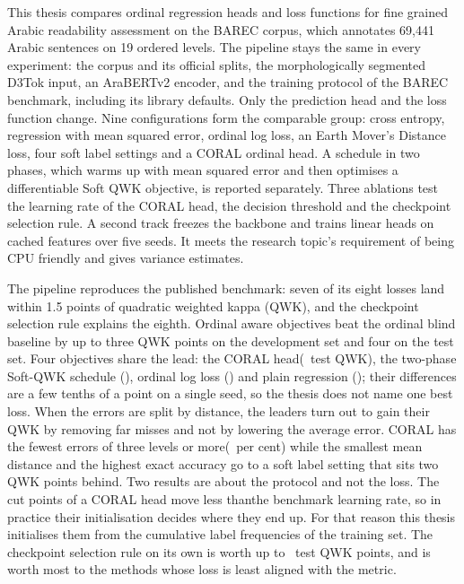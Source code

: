 \documentclass[12pt]{report}
\begin{document}
This thesis compares ordinal regression heads and loss functions for fine grained Arabic readability assessment on the BAREC corpus, which annotates 69,441 Arabic sentences on 19 ordered levels. The pipeline stays the same in every experiment: the corpus and its official splits, the morphologically segmented D3Tok input, an AraBERTv2 encoder, and the training protocol of the BAREC benchmark, including its library defaults. Only the prediction head and the loss function change. Nine configurations form the comparable group: cross entropy, regression with mean squared error, ordinal log loss, an Earth Mover's Distance loss, four soft label settings and a CORAL ordinal head. A schedule in two phases, which warms up with mean squared error and then optimises a differentiable Soft QWK objective, is reported separately. Three ablations test the learning rate of the CORAL head, the decision threshold and the checkpoint selection rule. A second track freezes the backbone and trains linear heads on cached features over five seeds. It meets the research topic's requirement of being CPU friendly and gives variance estimates.

The pipeline reproduces the published benchmark: seven of its eight losses land within 1.5 points of quadratic weighted kappa (QWK), and the checkpoint selection rule explains the eighth. Ordinal aware objectives beat the ordinal blind baseline by up to three QWK points on the development set and four on the test set. Four objectives share the lead: the CORAL head(\testQwkCoral\ test QWK), the two-phase Soft-QWK schedule (\testQwkSoftqwk), ordinal log loss (\testQwkOLL) and plain regression (\testQwkMSE); their differences are a few tenths of a point on a single seed, so the thesis does not name one best loss. When the errors are split by distance, the leaders turn out to gain their QWK by removing far misses and not by lowering the average error. CORAL has the fewest errors of three levels or more(\testFarThreeCoral\ per cent) while the smallest mean distance and the highest exact accuracy go to a soft label setting that sits two QWK points behind. Two results are about the protocol and not the loss. The cut points of a CORAL head move less than\cutMoveFineCoral\under the benchmark learning rate, so in practice their initialisation decides where they end up. For that reason this thesis initialises them from the cumulative label frequencies of the training set. The checkpoint selection rule on its own is worth up to \qwkselTestGainMax\ test QWK points, and is worth most to the methods whose loss is least aligned with the metric.
\end{document}
